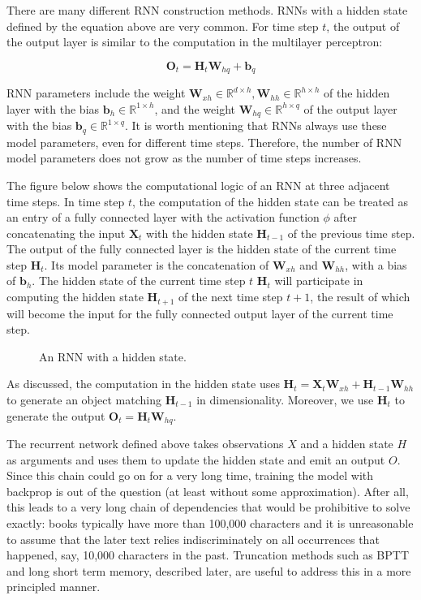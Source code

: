 There are many different RNN construction methods.  RNNs with a hidden state defined by the equation above are very common. For time step $t$, the output of the output layer is similar to the computation in the multilayer perceptron:

$$\mathbf{O}_t = \mathbf{H}_t \mathbf{W}_{hq} + \mathbf{b}_q$$

RNN parameters include the weight $\mathbf{W}_{xh} \in \mathbb{R}^{d \times h}, \mathbf{W}_{hh} \in \mathbb{R}^{h \times h}$ of the hidden layer with the bias $\mathbf{b}_h \in \mathbb{R}^{1 \times h}$, and the weight $\mathbf{W}_{hq} \in \mathbb{R}^{h \times q}$ of the output layer with the bias $\mathbf{b}_q \in \mathbb{R}^{1 \times q}$. It is worth mentioning that RNNs always use these model parameters, even for different time steps. Therefore, the number of RNN model parameters does not grow as the number of time steps increases.

The figure below shows the computational logic of an RNN at three adjacent time steps. In time step $t$, the computation of the hidden state can be treated as an entry of a fully connected layer with the activation function $\phi$ after concatenating the input $\mathbf{X}_t$ with the hidden state $\mathbf{H}_{t-1}$ of the previous time step.  The output of the fully connected layer is the hidden state of the current time step $\mathbf{H}_t$. Its model parameter is the concatenation of $\mathbf{W}_{xh}$ and $\mathbf{W}_{hh}$, with a bias of $\mathbf{b}_h$. The hidden state of the current time step $t$ $\mathbf{H}_t$ will participate in computing the hidden state $\mathbf{H}_{t+1}$ of the next time step $t+1$, the result of which will become the input for the fully connected output layer of the current time step.

\begin{figure}[hpt]
	\centering
	
	\caption{An RNN with a hidden state.}
	\label{fig:rnn}
\end{figure}

As discussed, the computation in the hidden state uses $\mathbf{H}_t = \mathbf{X}_t \mathbf{W}_{xh} + \mathbf{H}_{t-1} \mathbf{W}_{hh}$ to generate an object matching $\mathbf{H}_{t-1}$ in dimensionality. Moreover, we use $\mathbf{H}_t$ to generate the output $\mathbf{O}_t = \mathbf{H}_t \mathbf{W}_{hq}$.

The recurrent network defined above takes observations $X$ and a hidden state $H$ as arguments and uses them to update the hidden state and emit an output $O$. Since this chain could go on for a very long time, training the model with backprop is out of the question (at least without some approximation). After all, this leads to a very long chain of dependencies that would be prohibitive to solve exactly: books typically have more than 100,000 characters and it is unreasonable to assume that the later text relies indiscriminately on all occurrences that happened, say, 10,000 characters in the past. Truncation methods such as BPTT and long short term memory, described later, are useful to address this in a more principled manner. 

